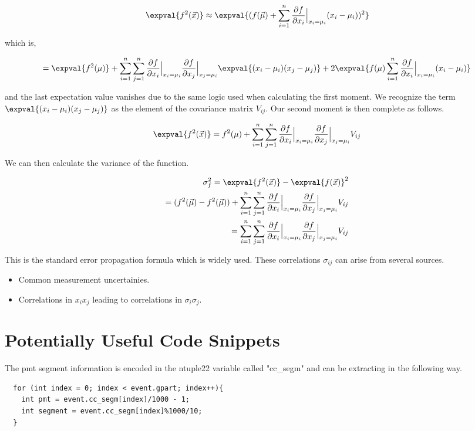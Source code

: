 \begin{equation}
        \expval{f^2(\vec{x})} \approx \expval{ (f(\vec{\mu}) + \sum_{i=1}^{n} \frac{\partial f}{\partial x_i} \Bigr|_{x_i = \mu_i} (x_i - \mu_i))^2 }
\end{equation}

which is, 

\begin{equation}
        = \expval{f^2(\mu)} + \sum_{i=1}^{n} \sum_{j=1}^{n} \frac{\partial f}{\partial x_i} \Bigr|_{x_i = \mu_i} \frac{\partial f}{\partial x_j} \Bigr|_{x_j = \mu_i} \expval{(x_i - \mu_i)(x_j - \mu_j)} + 2 \expval{f(\mu) \sum_{i=1}^{n} \frac{\partial f}{\partial x_i} \Bigr|_{x_i = \mu_i} (x_i-\mu_i)}
\end{equation}

and the last expectation value vanishes due to the same logic used when calculating the first moment.  We recognize the term $\expval{(x_i - \mu_i)(x_j - \mu_j)}$ as the element of the covariance matrix $V_{ij}$.  Our second moment is then complete as follows.

\begin{equation}
        \expval{f^2(\vec{x})}  = f^2(\mu) + \sum_{i=1}^{n} \sum_{j=1}^{n} \frac{\partial f}{\partial x_i} \Bigr|_{x_i = \mu_i} \frac{\partial f}{\partial x_j} \Bigr|_{x_j = \mu_i} V_{ij}
\end{equation}

We can then calculate the variance of the function.

\begin{align} 
    \sigma_{f}^2 = \expval{f^2(\vec{x})} - \expval{f(\vec{x})}^2 \\ 
    = (f^2(\vec{\mu}) - f^2(\vec{\mu})) + \sum_{i=1}^{n} \sum_{j=1}^{n} \frac{\partial f}{\partial x_i} \Bigr|_{x_i = \mu_i} \frac{\partial f}{\partial x_j} \Bigr|_{x_j = \mu_i} V_{ij} \\
    = \sum_{i=1}^{n} \sum_{j=1}^{n} \frac{\partial f}{\partial x_i} \Bigr|_{x_i = \mu_i} \frac{\partial f}{\partial x_j} \Bigr|_{x_j = \mu_i} V_{ij} 
\end{align}

This is the standard error propagation formula which is widely used.  These correlations $\sigma_{ij}$ can arise from several sources.

\begin{itemize}
    \item{Common measurement uncertainies.}
    \item{Correlations in $x_i x_j$ leading to correlations in $\sigma_i \sigma_j$.}
\end{itemize}

\section{Potentially Useful Code Snippets}
The pmt segment information is encoded in the ntuple22 variable called "cc_segm" and can be extracting in the following way. 

\begin{lstlisting}
  for (int index = 0; index < event.gpart; index++){
    int pmt = event.cc_segm[index]/1000 - 1;
    int segment = event.cc_segm[index]%1000/10; 
  }
\end{lstlisting}